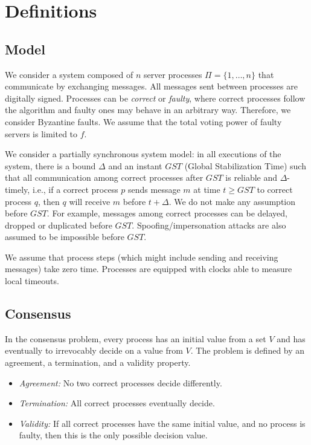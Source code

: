 \section{Definitions}
\label{sec:definitions}


\subsection{Model}

We consider a system composed of $n$ server processes $\Pi = \{ 1, \dots, n\}$ that communicate by exchanging messages.
All messages sent between processes are digitally signed.
Processes can be \emph{correct} or \emph{faulty}, where correct processes
follow the algorithm and faulty ones may behave in an arbitrary way. Therefore,
we consider Byzantine faults.  We assume that the total voting power of
faulty servers is limited to $f$.

We consider a partially synchronous system model:
in all executions of the system, there is a bound $\Delta$
and an instant $GST$ (Global Stabilization Time) such that all
communication among correct processes after $GST$ is reliable and $\Delta$-timely, i.e., if a correct process
$p$ sends message $m$ at time $t\ge GST$ to correct process $q$, then $q$ will receive $m$
before $t+\Delta$.
We do not make any assumption
before $GST$. For example, messages among correct processes can be
delayed, dropped or duplicated before $GST$. Spoofing/impersonation attacks are
also assumed to be impossible before $GST$.

We assume that process steps (which might include
sending and receiving messages)
take zero time.
Processes are equipped with clocks able to measure local timeouts.

 \subsection{Consensus}
 \label{sec:consensus}

 \newcommand{\propose}{\mathsf{Propose}}
 \newcommand{\decide}{\mathsf{Decide}}

 In the consensus problem, every process has an initial value from a
      set $V$ and has eventually to irrevocably decide on a value from
      $V$.
 The problem is defined by an agreement, a termination, and a validity
      property.

 \begin{itemize}
 \item \emph{Agreement:} No two correct processes decide differently.
 \item \emph{Termination:} All correct processes eventually decide.
 \item \emph{Validity:} If all correct processes have the same initial value, and no process
 is faulty, then this is the only possible decision value.
 \end{itemize}
